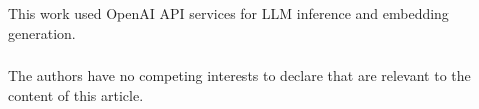 \documentclass[runningheads]{llncs}
\begin{document}
\begin{credits}
\subsubsection{\ackname}
This work used OpenAI API services for LLM inference and embedding generation.

\subsubsection{\discintname}
The authors have no competing interests to declare that are relevant to the content of this article.
\end{credits}

\end{document}
